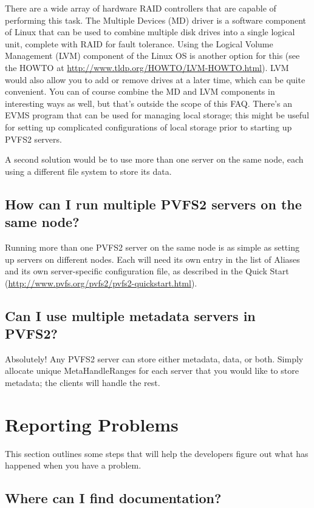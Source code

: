 \documentclass[11pt,letterpaper]{article}
\begin{document}
There are a wide array of hardware RAID controllers that are capable of
performing this task.
%
The Multiple Devices (MD) driver is a software component of Linux that can be
used to combine multiple disk drives into a single logical unit, complete with
RAID for fault tolerance.
%
Using the Logical Volume Management (LVM) component of the Linux OS is another
option for this (see the HOWTO at
\url{http://www.tldp.org/HOWTO/LVM-HOWTO.html}).  LVM would also allow you to
add or remove drives at a later time, which can be quite convenient.  You
can of course combine the MD and LVM components in interesting ways as well,
but that's outside the scope of this FAQ.
%
There's an EVMS program that can be used for managing local storage; this
might be useful for setting up complicated configurations of local storage
prior to starting up PVFS2 servers.

A second solution would be to use more than one server on the same node, each
using a different file system to store its data.

\subsection{How can I run multiple PVFS2 servers on the same node?}

Running more than one PVFS2 server on the same node is as simple as setting up
servers on different nodes.  Each will need its own entry in the list of
Aliases and its own server-specific configuration file, as described in the
Quick Start (\url{http://www.pvfs.org/pvfs2/pvfs2-quickstart.html}).

\subsection{Can I use multiple metadata servers in PVFS2?}

Absolutely!  Any PVFS2 server can store either metadata, data, or both.
Simply allocate unique MetaHandleRanges for each server that you would like to
store metadata; the clients will handle the rest.

%
%
\section{Reporting Problems}

This section outlines some steps that will help the developers figure out what
has happened when you have a problem.

\subsection{Where can I find documentation?}
\end{document}
